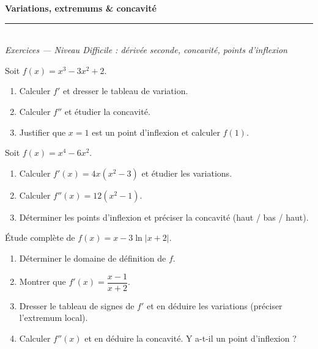 \documentclass[11pt,a4paper]{article}
\begin{document}
\begin{center}
{\LARGE\bfseries\color{primarydark} Variations, extremums \& concavité}\\[2pt]
{\color{primary}\rule{0.5\textwidth}{1.2pt}}\\[4pt]
{\small\itshape Exercices --- Niveau Difficile : dérivée seconde, concavité, points d'inflexion}
\end{center}
\vspace{2mm}

\begin{exo}[1]
Soit $f(x)=x^3-3x^2+2$.
\begin{enumerate}[label=\alph*),leftmargin=7mm,itemsep=1pt]
  \item Calculer $f'$ et dresser le tableau de variation.
  \item Calculer $f''$ et étudier la concavité.
  \item Justifier que $x=1$ est un point d'inflexion et calculer $f(1)$.
\end{enumerate}
\end{exo}

\begin{exo}[2]
Soit $f(x)=x^4-6x^2$.
\begin{enumerate}[label=\alph*),leftmargin=7mm,itemsep=1pt]
  \item Calculer $f'(x)=4x(x^2-3)$ et étudier les variations.
  \item Calculer $f''(x)=12(x^2-1)$.
  \item Déterminer les points d'inflexion et préciser la concavité (haut / bas / haut).
\end{enumerate}
\end{exo}

\begin{exo}[3]
Étude complète de $f(x)=x-3\ln|x+2|$.
\begin{enumerate}[label=\alph*),leftmargin=7mm,itemsep=1pt]
  \item Déterminer le domaine de définition de $f$.
  \item Montrer que $f'(x)=\dfrac{x-1}{x+2}$.
  \item Dresser le tableau de signes de $f'$ et en déduire les variations (préciser l'extremum local).
  \item Calculer $f''(x)$ et en déduire la concavité. Y a-t-il un point d'inflexion ?
\end{enumerate}
\end{exo}
\end{document}
